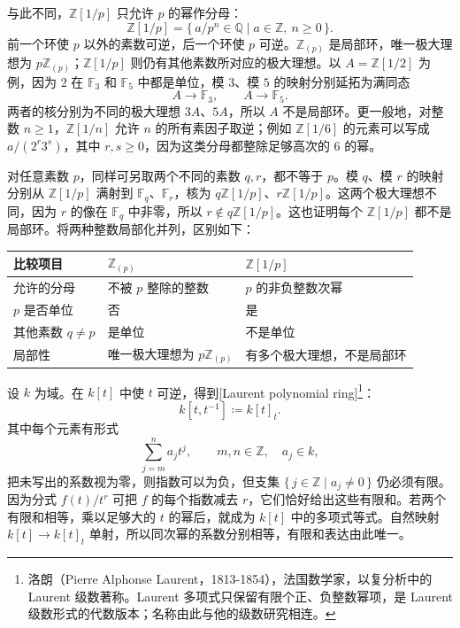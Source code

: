 \ProseParagraphBreak
与此不同，\(\mathbb Z[1/p]\) 只允许 \(p\) 的幂作分母：
\[
	\mathbb Z[1/p]=\{\,a/p^n\in\mathbb Q\mid a\in\mathbb Z,\ n\geq0\,\}.
\]
前一个环使 \(p\) 以外的素数可逆，后一个环使 \(p\) 可逆。\(\mathbb Z_{(p)}\) 是局部环，唯一极大理想为 \(p\mathbb Z_{(p)}\)；\(\mathbb Z[1/p]\) 则仍有其他素数所对应的极大理想。以 \(A=\mathbb Z[1/2]\) 为例，因为 \(2\) 在 \(\mathbb F_3\) 和 \(\mathbb F_5\) 中都是单位，模 \(3\)、模 \(5\) 的映射分别延拓为满同态
\[
	A\longrightarrow\mathbb F_3,\qquad A\longrightarrow\mathbb F_5.
\]
两者的核分别为不同的极大理想 \(3A\)、\(5A\)，所以 \(A\) 不是局部环。更一般地，对整数 \(n\geq1\)，\(\mathbb Z[1/n]\) 允许 \(n\) 的所有素因子取逆；例如 \(\mathbb Z[1/6]\) 的元素可以写成 \(a/(2^r3^s)\)，其中 \(r,s\geq0\)，因为这类分母都整除足够高次的 \(6\) 的幂。

\ProseParagraphBreak
对任意素数 \(p\)，同样可另取两个不同的素数 \(q,r\)，都不等于 \(p\)。模 \(q\)、模 \(r\) 的映射分别从 \(\mathbb Z[1/p]\) 满射到 \(\mathbb F_q\)、\(\mathbb F_r\)，核为 \(q\mathbb Z[1/p]\)、\(r\mathbb Z[1/p]\)。这两个极大理想不同，因为 \(r\) 的像在 \(\mathbb F_q\) 中非零，所以 \(r\notin q\mathbb Z[1/p]\)。这也证明每个 \(\mathbb Z[1/p]\) 都不是局部环。将两种整数局部化并列，区别如下：
\begin{center}
	\begin{tabularx}{\linewidth}{@{}lXX@{}}
		\toprule
		比较项目 & \(\mathbb Z_{(p)}\) & \(\mathbb Z[1/p]\) \\
		\midrule
		允许的分母 & 不被 \(p\) 整除的整数 & \(p\) 的非负整数次幂 \\
		\(p\) 是否单位 & 否 & 是 \\
		其他素数 \(q\ne p\) & 是单位 & 不是单位 \\
		局部性 & 唯一极大理想为 \(p\mathbb Z_{(p)}\) & 有多个极大理想，不是局部环 \\
		\bottomrule
	\end{tabularx}
\end{center}

设 \(k\) 为域。在 \(k[t]\) 中使 \(t\) 可逆，得到[Laurent polynomial ring]\footnote{洛朗（Pierre Alphonse Laurent，1813-1854），法国数学家，以复分析中的 Laurent 级数著称。Laurent 多项式只保留有限个正、负整数幂项，是 Laurent 级数形式的代数版本；名称由此与他的级数研究相连。}：
\[
	k[t,t^{-1}]\coloneqq k[t]_t.
\]
其中每个元素有形式
\[
	\sum_{j=m}^n a_jt^j,\qquad m,n\in\mathbb Z,\quad a_j\in k,
\]
把未写出的系数视为零，则指数可以为负，但支集 \(\{\,j\in\mathbb Z\mid a_j\ne0\,\}\) 仍必须有限。因为分式 \(f(t)/t^r\) 可把 \(f\) 的每个指数减去 \(r\)，它们恰好给出这些有限和。若两个有限和相等，乘以足够大的 \(t\) 的幂后，就成为 \(k[t]\) 中的多项式等式。自然映射 \(k[t]\rightarrow k[t]_t\) 单射，所以同次幂的系数分别相等，有限和表达由此唯一。

